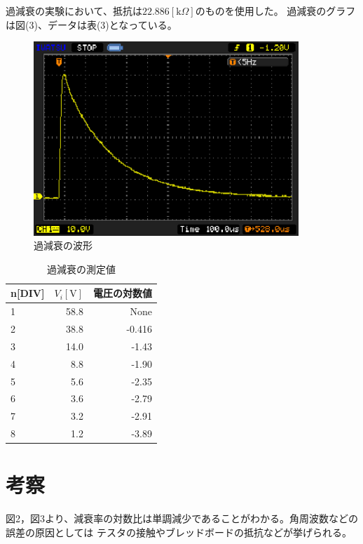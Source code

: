 \documentclass[a4j,10pt]{jarticle}
\begin{document}
過減衰の実験において、抵抗は$22.886[\mathrm k \Omega]$のものを使用した。
過減衰のグラフは図(3)、データは表(3)となっている。
\begin{figure}[h]
\begin{center}
\includegraphics[width=10cm]{over.eps}
\caption{過減衰の波形}
\end{center}
\end{figure}

\begin{table}[h]
\begin{center}
\caption{過減衰の測定値}
\begin{tabular}{|l|r|r|}
\hline
n[DIV]&$V_{i}[\mathrm V]$&電圧の対数値 \\ \hline \hline
1&58.8&None \\ \hline
2&38.8&-0.416 \\ \hline
3&14.0&-1.43 \\ \hline
4&8.8&-1.90 \\ \hline
5&5.6&-2.35  \\ \hline
6&3.6&-2.79  \\ \hline
7&3.2&-2.91  \\ \hline
8&1.2&-3.89  \\ \hline
\end{tabular}
\end{center}
\end{table}

\section{考察}
図2，図3より、減衰率の対数比は単調減少であることがわかる。角周波数などの誤差の原因としては
テスタの接触やブレッドボードの抵抗などが挙げられる。
\end{document}

